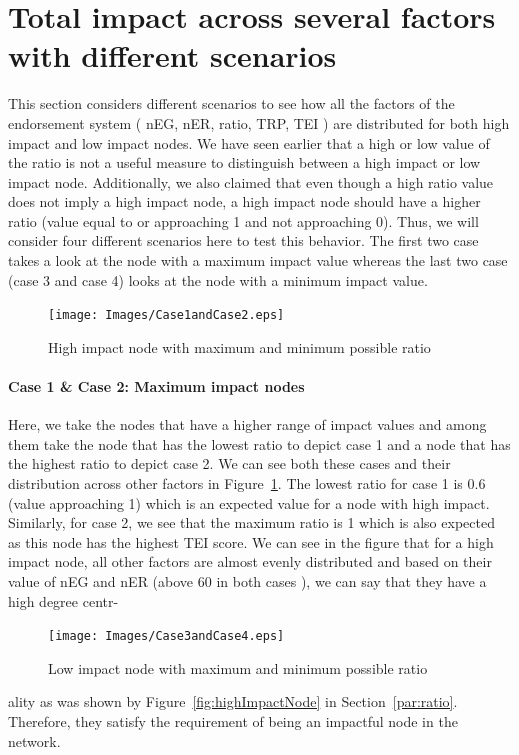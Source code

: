 \section{Total impact across several factors with different
scenarios}\label{Allcases}
This section considers different scenarios to see how all the factors of the
endorsement system ( \ac{nEG}, \ac{nER}, ratio, \ac{TRP}, \ac{TEI} ) are
distributed for both high impact and low impact nodes. We have seen earlier
that a high or low value of the ratio is not a useful measure to distinguish
between a high impact or low impact node. Additionally, we also claimed that
even though a high ratio value does not imply a high impact node, a high impact
node should have a higher ratio (value equal to or approaching 1 and not
approaching 0). Thus, we will consider four different scenarios here to test
this behavior. The first two case takes a look at the node with a maximum
impact value whereas the last two case (case 3 and case 4) looks at the node
with a minimum impact value.
\begin{figure}[h]
	\texttt{[image: Images/Case1andCase2.eps]}
	\caption{High impact node with maximum and minimum possible ratio}
	\label{fig:case1andcase2}
\end{figure}
\paragraph{Case 1 \& Case 2: Maximum impact nodes}Here, we take the nodes that
have a higher range of impact values and among them take the node that has the
lowest ratio to depict case 1 and a node that has the highest ratio to depict
case 2. We can see both these cases and their distribution across other factors
in Figure~\ref{fig:case1andcase2}. The lowest ratio for case 1 is 0.6 (value
approaching 1) which is an expected value for a node with high impact.
Similarly, for case 2, we see that the maximum ratio is 1 which is also
expected as this node has the highest \ac{TEI} score. We can see in the figure
that for a high impact node, all other factors are almost evenly distributed
and based on their value of \ac{nEG} and \ac{nER} (above 60 in both cases ), we
can say that they have a high degree centr-
\begin{figure}[H]
	\texttt{[image: Images/Case3andCase4.eps]}
	\caption{Low impact node with maximum and minimum possible ratio}
	\label{fig:case3andcase4}
\end{figure}
ality as was shown by Figure~\ref{fig:highImpactNode} in
Section~\ref{par:ratio}. Therefore, they satisfy the requirement of being an
impactful node in the network.
